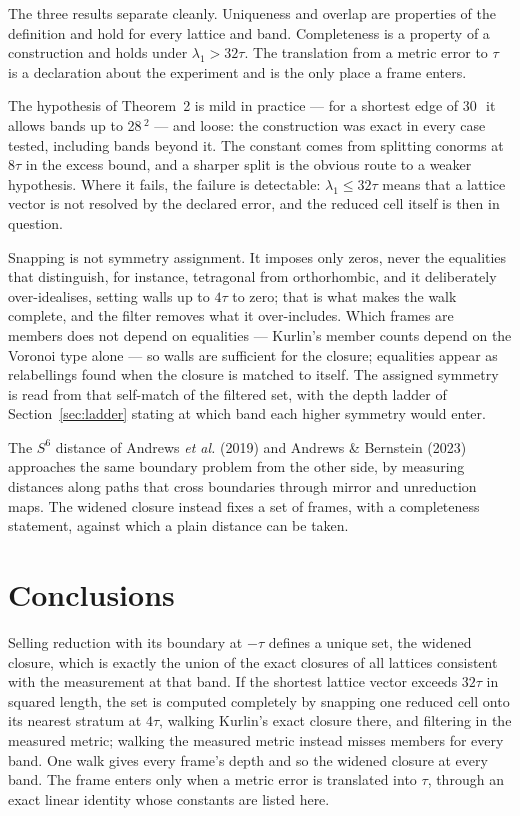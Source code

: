 \documentclass[preprint,pdf]{iucr}          %
\newcommand{\Ang}{\text{\AA}}
\begin{document}
The three results separate cleanly. Uniqueness and overlap are properties of the definition and hold for every lattice and band. Completeness is a property of a construction and holds under $\lambda_1>32\tau$. The translation from a metric error to $\tau$ is a declaration about the experiment and is the only place a frame enters.

The hypothesis of Theorem~2 is mild in practice --- for a shortest edge of 30\,\Ang\ it allows bands up to 28\,\Ang$^2$ --- and loose: the construction was exact in every case tested, including bands beyond it. The constant comes from splitting conorms at $8\tau$ in the excess bound, and a sharper split is the obvious route to a weaker hypothesis. Where it fails, the failure is detectable: $\lambda_1\le32\tau$ means that a lattice vector is not resolved by the declared error, and the reduced cell itself is then in question.

Snapping is not symmetry assignment. It imposes only zeros, never the equalities that distinguish, for instance, tetragonal from orthorhombic, and it deliberately over-idealises, setting walls up to $4\tau$ to zero; that is what makes the walk complete, and the filter removes what it over-includes. Which frames are members does not depend on equalities --- Kurlin's member counts depend on the Voronoi type alone --- so walls are sufficient for the closure; equalities appear as relabellings found when the closure is matched to itself. The assigned symmetry is read from that self-match of the filtered set, with the depth ladder of Section~\ref{sec:ladder} stating at which band each higher symmetry would enter.

The $S^6$ distance of Andrews \emph{et al.} (2019) and Andrews \& Bernstein (2023) approaches the same boundary problem from the other side, by measuring distances along paths that cross boundaries through mirror and unreduction maps. The widened closure instead fixes a set of frames, with a completeness statement, against which a plain distance can be taken.

\section{Conclusions}

Selling reduction with its boundary at $-\tau$ defines a unique set, the widened closure, which is exactly the union of the exact closures of all lattices consistent with the measurement at that band. If the shortest lattice vector exceeds $32\tau$ in squared length, the set is computed completely by snapping one reduced cell onto its nearest stratum at $4\tau$, walking Kurlin's exact closure there, and filtering in the measured metric; walking the measured metric instead misses members for every band. One walk gives every frame's depth and so the widened closure at every band. The frame enters only when a metric error is translated into $\tau$, through an exact linear identity whose constants are listed here.
\end{document}
